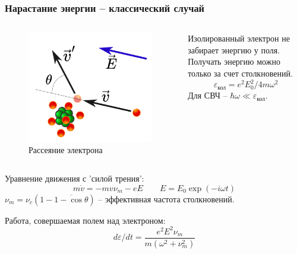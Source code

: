 \documentclass{beamer}
\begin{document}
	\begin{frame}
		\frametitle{Нарастание энергии -- классический случай}
		
		
		
		\begin{columns}
			\begin{figure}
				\centering
				\includegraphics[width=0.8\linewidth]{res/collision.png}
				\caption*{Рассеяние электрона}
			\end{figure}
			
			Изолированный электрон не забирает энергию у поля. Получать энергию можно только за счет столкновений.
			$$ \varepsilon_{\text{кол}} = e^2 E_0^2/4m\omega^2 $$
			Для СВЧ -- $\hbar \omega \ll \varepsilon_{\text{кол}}$.
		\end{columns}

		
		Уравнение движения с 'силой трения':
		$$ m \dot{v} = - m v \nu_m - e E \qquad E = E_0 \exp(-i \omega t)$$
		$\nu_m = \nu_c (1 - \overline{1 - \cos \theta})$ -- эффективная частота столкновений.
		
		Работа, совершаемая полем над электроном:
		\begin{equation}
			d\varepsilon/dt = \frac{e^2 E^2 \nu_m}{m (\omega^2 + \nu_m^2)}
			\label{eq:energy_growth}
		\end{equation}


\end{frame}
\end{document}
